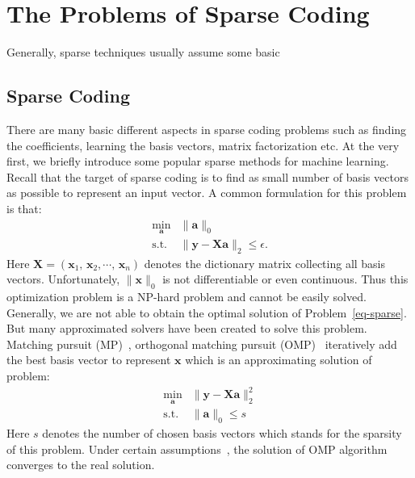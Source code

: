 \section{The Problems of Sparse Coding}
Generally, sparse techniques usually assume some basic
\subsection{Sparse Coding}
There are many basic different aspects in sparse coding problems such as finding the coefficients, learning the basis vectors, matrix factorization etc.
At the very first, we briefly introduce some popular sparse methods for machine learning.
Recall that the target of sparse coding is to find as small number of basis vectors as possible to represent an input vector.
A common formulation for this problem is that:
\begin{equation}
\begin{array}{cl}
\min_{\mathbf{a}} & \|\mathbf{a}\|_0\\
\mathrm{s.t.} & \|\mathbf{y}-\mathbf{X}\mathbf{a}\|_2 \leq \epsilon.
\end{array}
\label{eq-sparse}
\end{equation}
Here $\mathbf{X}=(\mathbf{x}_1,\,\mathbf{x}_2,\cdots ,\,\mathbf{x}_n)$ denotes the dictionary matrix collecting all basis vectors.
Unfortunately, $\|\mathbf{x}\|_0$ is not differentiable or even continuous.
Thus this optimization problem is a NP-hard problem and cannot be easily solved.
Generally, we are not able to obtain the optimal solution of Problem~\ref{eq-sparse}.
But many approximated solvers have been created to solve this problem.
Matching pursuit (MP)~\cite{mallat1993matching}, orthogonal matching pursuit (OMP)~\cite{pati1993orthogonal,tropp2007signal} iteratively add the best basis vector to represent $\mathbf{x}$ which is an approximating solution of problem:
\begin{equation}
\begin{array}{cl}
\min_{\mathbf{a}} & \|\mathbf{y}-\mathbf{X}\mathbf{a}\|_2^2 \\
\mathrm{s.t.} & \|\mathbf{a}\|_0 \leq s
\end{array}
\end{equation}
Here $s$ denotes the number of chosen basis vectors which stands for the sparsity of this problem.
Under certain assumptions~\cite{pati1993orthogonal}, the solution of OMP algorithm converges to the real solution.

